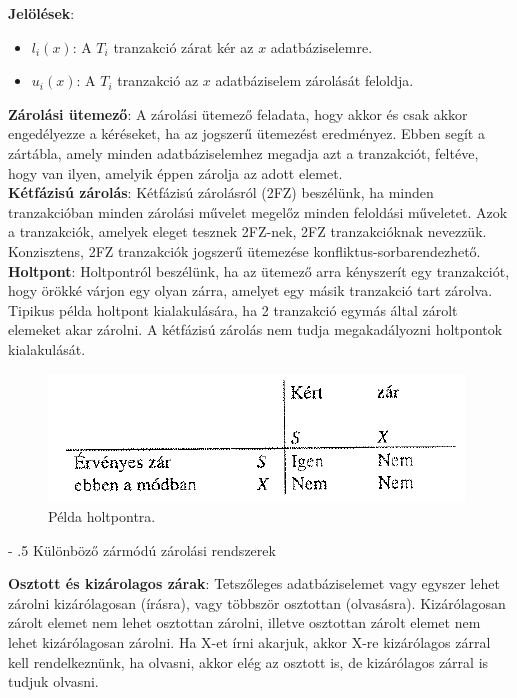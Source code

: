 \documentclass[margin=0px]{article}
\makeatletter
\renewcommand\paragraph{%
	\@startsection{paragraph}{4}{0mm}%
	{-\baselineskip}%
	{.5\baselineskip}%
	{\normalfont\normalsize\bfseries}}
\makeatother
\begin{document}
\noindent \textbf{Jelölések}:
\begin{itemize}
    \item	$l_{i}(x)$: A $T_{i}$ tranzakció zárat kér az $x$ adatbáziselemre.
    \item	$u_{i}(x)$: A $T_{i}$ tranzakció az $x$ adatbáziselem zárolását feloldja.
\end{itemize}

\noindent \textbf{Zárolási ütemező}: A zárolási ütemező feladata, hogy akkor és csak akkor engedélyezze a kéréseket, ha
az jogszerű ütemezést eredményez. Ebben segít a zártábla, amely minden adatbáziselemhez megadja azt a tranzakciót, feltéve, hogy
van ilyen, amelyik éppen zárolja az adott elemet.\\

\noindent \textbf{Kétfázisú zárolás}: Kétfázisú zárolásról (2FZ) beszélünk, ha minden tranzakcióban minden zárolási művelet
megelőz minden feloldási műveletet. Azok a tranzakciók, amelyek eleget tesznek 2FZ-nek, 2FZ tranzakcióknak nevezzük. Konzisztens,
2FZ tranzakciók	jogszerű ütemezése konfliktus-sorbarendezhető.\\

\noindent \textbf{Holtpont}: Holtpontról beszélünk, ha az ütemező arra kényszerít egy tranzakciót, hogy örökké várjon egy olyan
zárra, amelyet egy másik tranzakció tart zárolva. Tipikus példa holtpont kialakulására, ha 2 tranzakció egymás által zárolt
elemeket akar zárolni. A kétfázisú zárolás nem tudja megakadályozni holtpontok kialakulását.

\begin{figure}[H]
    \centering
    \includegraphics[width=0.5\linewidth]{img/deadlock}
    \caption{Példa holtpontra.}
    \label{fig:deadlock}
\end{figure}

\paragraph{Különböző zármódú zárolási rendszerek}

\noindent \textbf{Osztott és kizárolagos zárak}: Tetszőleges adatbáziselemet vagy egyszer lehet zárolni kizárólagosan (írásra), vagy
többször osztottan (olvasásra). Kizárólagosan zárolt elemet nem lehet osztottan zárolni, illetve osztottan zárolt elemet
nem lehet kizárólagosan zárolni. Ha X-et írni akarjuk, akkor X-re kizárólagos zárral kell rendelkeznünk, ha olvasni, akkor
elég az osztott is, de kizárólagos zárral is tudjuk olvasni.\\
\end{document}
